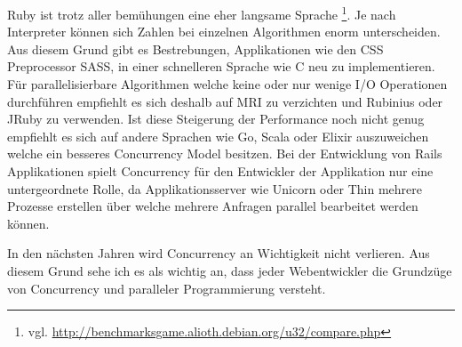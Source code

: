 Ruby ist trotz aller bemühungen eine eher langsame Sprache \footnote{vgl. \url{http://benchmarksgame.alioth.debian.org/u32/compare.php}}. Je nach Interpreter können sich Zahlen bei einzelnen Algorithmen enorm unterscheiden. Aus diesem Grund gibt es Bestrebungen, Applikationen wie den CSS Preprocessor SASS, in einer schnelleren Sprache wie C neu zu implementieren. Für parallelisierbare Algorithmen welche keine oder nur wenige I/O Operationen durchführen empfiehlt es sich deshalb auf MRI zu verzichten und Rubinius oder JRuby zu verwenden. Ist diese Steigerung der Performance noch nicht genug empfiehlt es sich auf andere Sprachen wie Go, Scala oder Elixir auszuweichen welche ein besseres Concurrency Model besitzen. Bei der Entwicklung von Rails Applikationen spielt Concurrency für den Entwickler der Applikation nur eine untergeordnete Rolle, da Applikationsserver wie Unicorn oder Thin mehrere Prozesse erstellen über welche mehrere Anfragen parallel bearbeitet werden können.

In den nächsten Jahren wird Concurrency an Wichtigkeit nicht verlieren. Aus diesem Grund sehe ich es als wichtig an, dass jeder Webentwickler die Grundzüge von Concurrency und paralleler Programmierung versteht. 